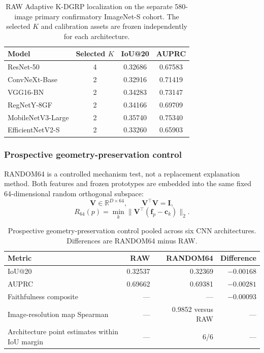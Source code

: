 \begin{table}[!htbp]
\centering
\caption{RAW Adaptive K-DGRP localization on the separate 580-image primary
confirmatory ImageNet-S cohort. The selected $K$ and calibration assets are
frozen independently for each architecture.}
\label{tab:kdgrp-primary580}
\small
\begin{tabular}{lccc}
\toprule
Model & Selected $K$ & IoU@20 & AUPRC\\
\midrule
ResNet-50          & 4 & 0.32686 & 0.67583\\
\thinrowrule
ConvNeXt-Base      & 2 & 0.32916 & 0.71419\\
\thinrowrule
VGG16-BN           & 2 & 0.34283 & 0.73147\\
\thinrowrule
RegNetY-8GF        & 2 & 0.34166 & 0.69709\\
\thinrowrule
MobileNetV3-Large  & 2 & 0.35740 & 0.75340\\
\thinrowrule
EfficientNetV2-S   & 2 & 0.33260 & 0.65903\\
\bottomrule
\end{tabular}
\end{table}

\subsubsection{Prospective geometry-preservation control}

RANDOM64 is a controlled mechanism test, not a replacement explanation method.
Both features and frozen prototypes are embedded into the same fixed
64-dimensional random orthogonal subspace:
\begin{equation}
    \bm V\in\mathbb{R}^{D\times64},\qquad
    \bm V^\top\bm V=\bm I,
\end{equation}
\begin{equation}
    R_{64}(p)=
    \min_k\|\bm V^\top(\bm f_p-\bm c_k)\|_2.
    \label{eq:kdgrp-random64}
\end{equation}

\begin{table}[!htbp]
\centering
\caption{Prospective geometry-preservation control pooled across six CNN
architectures. Differences are RANDOM64 minus RAW.}
\label{tab:kdgrp-random64}
\small
\begin{tabularx}{0.92\linewidth}{Yrrr}
\toprule
Metric & RAW & RANDOM64 & Difference\\
\midrule
IoU@20 & 0.32537 & 0.32369 & $-0.00168$\\
\thinrowrule
AUPRC & 0.69662 & 0.69381 & $-0.00281$\\
\thinrowrule
Faithfulness composite & --- & --- & $-0.00093$\\
\thinrowrule
Image-resolution map Spearman & --- & 0.9852 versus RAW & ---\\
\thinrowrule
Architecture point estimates within IoU margin & --- & 6/6 & ---\\
\bottomrule
\end{tabularx}
\end{table}

